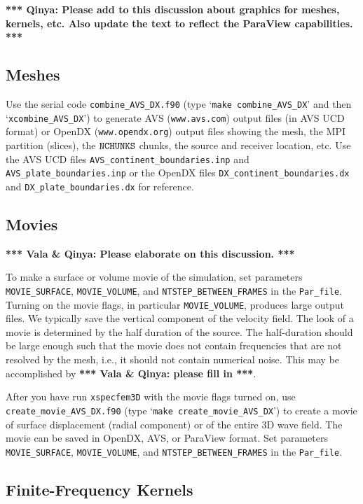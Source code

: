 \documentclass[onecolumn]{article}
\newcommand{\tovalaqinya}[1]{\textbf{*** Vala \& Qinya: #1 ***}}
\newcommand{\toqinya}[1]{\textbf{*** Qinya: #1 ***}}
\newcommand{\nchunks}{\mbox{\texttt{NCHUNKS}}}
\begin{document}
\toqinya{Please add to this discussion about graphics for meshes, kernels, etc.
Also update the text to reflect the ParaView capabilities.}

\subsection{Meshes}
\label{section:meshgraphics}

Use the serial code \texttt{combine\_AVS\_DX.f90}
(type `\texttt{make combine\_AVS\_DX}' and then
`\texttt{xcombine\_AVS\_DX}') to generate AVS (\texttt{www.avs.com}) output files
(in AVS UCD format) or OpenDX (\texttt{www.opendx.org}) output files showing the mesh,
the MPI partition (slices), the $\nchunks$ chunks, the
source and receiver location, etc.
Use the AVS UCD files \texttt{AVS\_continent\_boundaries.inp} and
\texttt{AVS\_plate\_boundaries.inp} or the OpenDX files
\texttt{DX\_continent\_boundaries.dx} and \texttt{DX\_plate\_boundaries.dx}
for reference.

\subsection{Movies}
\label{section:movies}

\tovalaqinya{Please elaborate on this discussion.}

To make a surface or volume movie of the simulation,
set parameters
\texttt{MOVIE\_SURFACE}, \texttt{MOVIE\_VOLUME}, and \texttt{NTSTEP\_BETWEEN\_FRAMES}
in the \texttt{Par\_file}.
Turning on the movie flags, in particular  \texttt{MOVIE\_VOLUME}, produces
large output files.
We typically save the vertical component of the velocity field.
The look of a movie is determined by the half duration of the source.
The half-duration should be large enough such that the movie does
not contain frequencies that are not resolved by the mesh, i.e., it should
not contain numerical noise.
This may be accomplished by \tovalaqinya{please fill in}.

After you have run \texttt{xspecfem3D} with the movie flags turned on,
use \texttt{create\_movie\_AVS\_DX.f90} (type `\texttt{make create\_movie\_AVS\_DX}')
to create a movie of surface displacement (radial component) or of the entire 3D wave
field. The movie can be saved in OpenDX, AVS, or ParaView format.
Set parameters
\texttt{MOVIE\_SURFACE}, \texttt{MOVIE\_VOLUME}, and \texttt{NTSTEP\_BETWEEN\_FRAMES}
in the \texttt{Par\_file}.

\subsection{Finite-Frequency Kernels}
\end{document}

